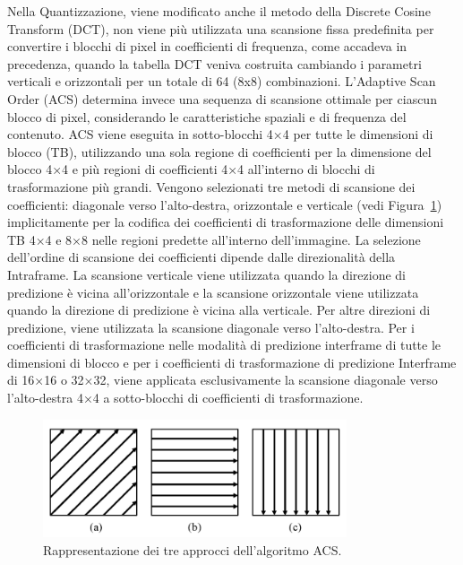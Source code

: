 \documentclass[a4paper,12pt, oneside]{article}
\begin{document}
Nella Quantizzazione, viene modificato anche il metodo della Discrete Cosine Transform (DCT), non viene
più utilizzata una scansione fissa predefinita per convertire i blocchi di pixel in coefficienti di frequenza, come accadeva in precedenza,
quando la tabella DCT veniva costruita cambiando i parametri verticali e orizzontali per un totale di 64 (8x8)
combinazioni.
L'Adaptive Scan Order (ACS) determina invece una sequenza di scansione ottimale per ciascun blocco di pixel,
considerando le caratteristiche spaziali e di frequenza del contenuto. ACS viene eseguita in sotto-blocchi
4×4 per tutte le dimensioni di blocco (TB), utilizzando una sola regione di coefficienti per la dimensione
del blocco 4×4 e più regioni di coefficienti 4×4 all'interno di blocchi di trasformazione più grandi. Vengono
selezionati tre metodi di scansione dei coefficienti: diagonale verso l'alto-destra, orizzontale e verticale
(vedi Figura~\ref{fig:HEVC_ACS}) implicitamente per la codifica dei coefficienti di trasformazione delle
dimensioni TB 4×4 e 8×8 nelle regioni predette all'interno dell'immagine. La selezione dell'ordine di
scansione dei coefficienti dipende dalle direzionalità della Intraframe. La scansione verticale viene
utilizzata quando la direzione di predizione è vicina all'orizzontale e la scansione orizzontale viene
utilizzata quando la direzione di predizione è vicina alla verticale. Per altre direzioni di predizione,
viene utilizzata la scansione diagonale verso l'alto-destra. Per i coefficienti di trasformazione nelle
modalità di predizione interframe di tutte le dimensioni di blocco e per i coefficienti di trasformazione
di predizione Interframe di 16×16 o 32×32, viene applicata esclusivamente la scansione diagonale verso
l'alto-destra 4×4 a sotto-blocchi di coefficienti di trasformazione.

\begin{figure}[h]
    \centering
    \includegraphics[width=0.8\textwidth]{images/HEVC-ACS.png}
    \caption{Rappresentazione dei tre approcci dell'algoritmo ACS.}
    \label{fig:HEVC_ACS}
\end{figure}
\end{document}
